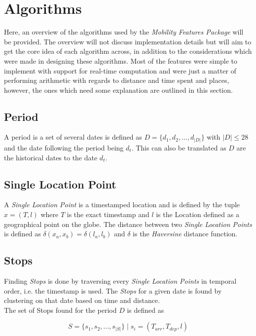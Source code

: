 \section{Algorithms}
Here, an overview of the algorithms used by the \textit{Mobility Features Package} will be provided. The overview will not discuss implementation details but will aim to get the core idea of each algorithm across, in addition to the considerations which were made in designing these algorithms. Most of the features were simple to implement with support for real-time computation and were just a matter of performing arithmetic with regards to distance and time spent and places, however, the ones which need some explanation are outlined in this section. 

\subsection{Period}
A period is a set of several dates is defined as $D = \{d_1, d_2, ..., d_{|D|}\}$ with $|D| \leq 28$ and the date following the period being $d_t$. This can also be translated as $D$ are the historical dates to the date $d_t$.\\

\subsection{Single Location Point}
A \textit{Single Location Point} is a timestamped location and is defined by the tuple $x = (T, l)$ where $T$ is the exact timestamp and $l$ is the Location defined as a geographical point on the globe. The distance between two \textit{Single Location Points} is defined as $\delta(x_a, x_b) = \delta(l_a, l_b)$ and $\delta$ is the \textit{Haversine} distance function.

\subsection{Stops}
Finding \textit{Stops} is done by traversing every \textit{Single Location Points} in temporal order, i.e. the timestamp is used. The \textit{Stops} for a given date is found by clustering  on that date based on time and distance. \\

The set of Stops found for the period $D$ is defined as

$$S = \{s_1, s_2, ..., s_{|S|}\} \;| \; s_i = (T_{arr}, T_{dep}, l)$$ 

